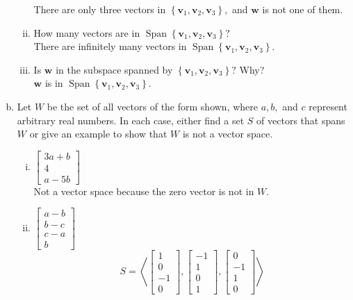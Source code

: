 \begin{enumerate}[(a)]
\begin{enumerate}[(i)]
        There are only three vectors in $\left\{\mathbf{v}_{1}, \mathbf{v}_{2}, \mathbf{v}_{3}\right\},$ and $\mathbf{w}$ is not one of them.
        \item How many vectors are in $\operatorname{Span}\left\{\mathbf{v}_{1}, \mathbf{v}_{2}, \mathbf{v}_{3}\right\}?$\\
        There are infinitely many vectors in $\operatorname{Span}\left\{\mathbf{v}_{1}, \mathbf{v}_{2}, \mathbf{v}_{3}\right\}$.
        \item Is $\mathbf{w}$ in the subspace spanned by $\left\{\mathbf{v}_{1}, \mathbf{v}_{2}, \mathbf{v}_{3}\right\}?$ Why?\\
        $\mathbf{w}$ is in $\operatorname{Span}\left\{\mathbf{v}_{1}, \mathbf{v}_{2}, \mathbf{v}_{3}\right\}$.
    \end{enumerate}
    \item Let $W$ be the set of all vectors of the form shown, where $a, b,$ and $c$ represent arbitrary real numbers. In each case, either find a set $S$ of vectors that spans $W$ or give an example to show that $W$ is not a vector space.
    \begin{enumerate}[(i)]
        \item
        $\left[\begin{array}{c}3 a+b \\ 4 \\ a-5 b\end{array}\right]$\\
        Not a vector space because the zero vector is not in $W$.
        \item
        $\left[\begin{array}{c}a-b \\ b-c \\ c-a \\ b\end{array}\right]$
        $$
        S=\left\langle\left[\begin{array}{r}1 \\ 0 \\ -1 \\ 0\end{array}\right],\left[\begin{array}{r}-1 \\ 1 \\ 0 \\ 1\end{array}\right],\left[\begin{array}{r}0 \\ -1 \\ 1 \\ 0\end{array}\right]\right\rangle
$$
\end{enumerate}
\end{enumerate}
